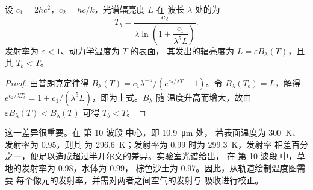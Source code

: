 \begin{proposition}[由辐亮度求亮度温度]\label{prop:b3:remote-sensing-gis:planck-inversion}
设 $c_1 = 2hc^2$，$c_2 = hc/k$，光谱辐亮度 $L$ 在
波长 $\lambda$ 处的为
\[
T_b = \frac{c_2}{\lambda \ln\!\left(1 + \dfrac{c_1}{\lambda^5 L}\right)} .
\]
发射率为 $\varepsilon < 1$、动力学温度为 $T$ 的表面，
其发出的辐亮度为 $L = \varepsilon B_\lambda(T)$，且其 $T_b < T$。
\end{proposition}

\begin{proof}
由普朗克定律得 $B_\lambda(T) = c_1\lambda^{-5}/(e^{c_2/\lambda T} -
1)$。令 $B_\lambda(T_b) = L$，解得 $e^{c_2/\lambda T_b} = 1 +
c_1/(\lambda^5L)$，即为上式。$B_\lambda$ 随
温度升高而增大，故由 $\varepsilon B_\lambda(T) < B_\lambda(T)$ 可得 $T_b < T$。
\end{proof}

这一差异很重要。在 第 10 波段 中心，即 \qty{10.9}{\micro\metre} 处，
若表面温度为 \qty{300}{K}、发射率为 0.95，则其
为 \qty{296.6}{K}；发射率为 0.99 时为 \qty{299.3}{K}，发射率
相差百分之一，便足以造成超过半开尔文的差异。实验室光谱给出，
在 第 10 波段 中，草地的发射率为 0.98，水体为 0.99，
棕色沙土为 0.97。因此，从轨道绘制温度图需要
每个像元的发射率，并需对两者之间空气的发射与
吸收进行校正。

